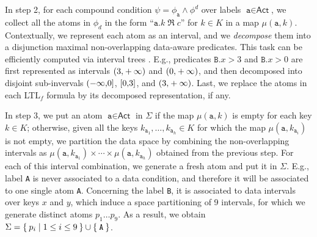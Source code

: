 In step 2, for each compound condition $\psi=\phi_{\texttt{a}}\wedge \phi^d$ over labels $\texttt{a}\in\textsf{Act}$, we collect all the atoms in $\phi_d$ in the form ``$\texttt{a}.k\;\Re\; c$'' for $k\in K$ in a map $\mu(\texttt{a},k)$. Contextually, we represent each atom as an interval, and we \textit{decompose} them
%
%
%
%
%
%
%
into a disjunction maximal non-overlapping data-aware predicates. This task can be efficiently computed via interval trees \cite{inttree}. E.g., predicates $\texttt{B}.x>3$ and $\texttt{B}.x>0$ are first represented as intervals $\interval({3,+\infty})$ and $\interval({0,+\infty})$, and then decomposed into disjoint sub-invervals $\interval({-\infty,0}]$, $\interval[{0,3}]$, and $\interval({3,+\infty})$. Last, we replace the atoms in each LTL$_f$ formula by its decomposed representation, if any.


In step 3, we put an atom $\texttt{a}\in\textsf{Act}$ in $\Sigma$ if the map $\mu(\texttt{a},k)$ is empty for each key $k\in K$; otherwise, given all the keys $k_{\texttt{a}_1},\dots,k_{\texttt{a}_h}\in K$ for which the map $\mu(\texttt{a},k_{\texttt{a}_i})$ is not empty, we partition the data space by combining the non-overlapping intervals as $\mu(\texttt{a},k_{\texttt{a}_1})\times\cdots\times\mu(\texttt{a},k_{\texttt{a}_h})$ obtained from the previous step. For each of this interval combination, we generate a fresh atom and put it in $\Sigma$. E.g., label \texttt{A} is never associated to a data condition, and therefore it will be associated to one single atom \texttt{A}. Concerning the label \texttt{B}, it is associated to data intervals over keys $x$ and $y$, which induce a space partitioning of 9 intervals, for which we generate distinct atoms $p_1\dots p_9$. As a result, we obtain $\Sigma=\Set{p_i|1\leq i\leq 9}\cup\Set{\texttt{A}}$.


